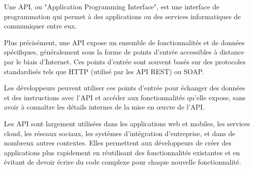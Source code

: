 Une API, ou "Application Programming Interface", est une interface de programmation qui permet à des applications ou des services informatiques de communiquer entre eux.

Plus précisément, une API expose un ensemble de fonctionnalités et de données spécifiques, généralement sous la forme de points d'entrée accessibles à distance par le biais d'Internet. Ces points d'entrée sont souvent basés sur des protocoles standardisés tels que HTTP (utilisé par les API REST) ou SOAP.

Les développeurs peuvent utiliser ces points d'entrée pour échanger des données et des instructions avec l'API et accéder aux fonctionnalités qu'elle expose, sans avoir à connaître les détails internes de la mise en œuvre de l'API.

Les API sont largement utilisées dans les applications web et mobiles, les services cloud, les réseaux sociaux, les systèmes d'intégration d'entreprise, et dans de nombreux autres contextes. Elles permettent aux développeurs de créer des applications plus rapidement en réutilisant des fonctionnalités existantes et en évitant de devoir écrire du code complexe pour chaque nouvelle fonctionnalité.
